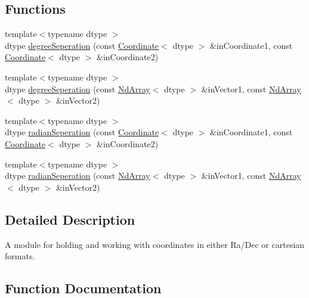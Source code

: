 \subsection*{Functions}
\begin{DoxyCompactItemize}
\item 
{\footnotesize template$<$typename dtype $>$ }\\dtype \mbox{\hyperlink{namespace_num_c_1_1_coordinates_a3b695f21f748403aec310ba37ac39956}{degree\+Seperation}} (const \mbox{\hyperlink{class_num_c_1_1_coordinates_1_1_coordinate}{Coordinate}}$<$ dtype $>$ \&in\+Coordinate1, const \mbox{\hyperlink{class_num_c_1_1_coordinates_1_1_coordinate}{Coordinate}}$<$ dtype $>$ \&in\+Coordinate2)
\item 
{\footnotesize template$<$typename dtype $>$ }\\dtype \mbox{\hyperlink{namespace_num_c_1_1_coordinates_afc8ea343df2b0b3060e41bc1ff4c28c7}{degree\+Seperation}} (const \mbox{\hyperlink{class_num_c_1_1_nd_array}{Nd\+Array}}$<$ dtype $>$ \&in\+Vector1, const \mbox{\hyperlink{class_num_c_1_1_nd_array}{Nd\+Array}}$<$ dtype $>$ \&in\+Vector2)
\item 
{\footnotesize template$<$typename dtype $>$ }\\dtype \mbox{\hyperlink{namespace_num_c_1_1_coordinates_a480804b5ece54f2468163256c0fa8171}{radian\+Seperation}} (const \mbox{\hyperlink{class_num_c_1_1_coordinates_1_1_coordinate}{Coordinate}}$<$ dtype $>$ \&in\+Coordinate1, const \mbox{\hyperlink{class_num_c_1_1_coordinates_1_1_coordinate}{Coordinate}}$<$ dtype $>$ \&in\+Coordinate2)
\item 
{\footnotesize template$<$typename dtype $>$ }\\dtype \mbox{\hyperlink{namespace_num_c_1_1_coordinates_a1e42c59854af0ce7ead309772211fcf4}{radian\+Seperation}} (const \mbox{\hyperlink{class_num_c_1_1_nd_array}{Nd\+Array}}$<$ dtype $>$ \&in\+Vector1, const \mbox{\hyperlink{class_num_c_1_1_nd_array}{Nd\+Array}}$<$ dtype $>$ \&in\+Vector2)
\end{DoxyCompactItemize}


\subsection{Detailed Description}
A module for holding and working with coordinates in either Ra/\+Dec or cartesian formats. 

\subsection{Function Documentation}
\mbox{\label{namespace_num_c_1_1_coordinates_a3b695f21f748403aec310ba37ac39956}} 
